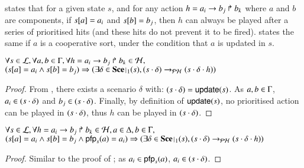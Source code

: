  states that for a given state $s$, and for any action $h = a_i\rightarrow b_j\Rsh b_k$ where $a$ and $b$ are components,
if ${s[a]} = a_i$ and ${s[b]} = b_j$, then
$h$ can always be played after a series of prioritised hits (and these hits do not prevent it to be fired).
 states the same if $a$ is a cooperative sort, under the condition that $a$ is updated in $s$.
\begin{lemma}
\label{lem:hcompcomp}
  $\forall s \in \mathcal{L}, \forall a,b \in \Gamma, \forall h = a_i\rightarrow b_j\Rsh b_k \in \mathcal{H},$\\
  $(\PHget{s}{a} = a_i \wedge \PHget{s}{b} = b_j) \Rightarrow (\exists \delta \in \restriction{\Sce}{1}(s),
  (s \PHplay \delta) \PHPtrans (s \PHplay \delta \PHplay h))$
\end{lemma}
%
\begin{proof}
  From , there exists a scenario $\delta$ with: $(s \cdot \delta) = \mathsf{update}(s)$.
  As $a,b \in \Gamma$, $a_i \in (s \cdot \delta)$ and $b_j \in (s \cdot \delta)$.
  Finally, by definition of $\mathsf{update}(s)$, no prioritised action can be played in $(s \cdot \delta)$, thus $h$ can be played in $(s \cdot \delta)$.
\end{proof}
%
\begin{lemma}
\label{lem:hcscomp}
  $\forall s \in \mathcal{L}, \forall h = a_i\rightarrow b_j\Rsh b_k \in \mathcal{H}, a \in \Delta, b \in \Gamma,$\\
  $(\PHget{s}{a} = a_i \wedge \PHget{s}{b} = b_j \wedge \pfp_s(a) = a_i) \Rightarrow (\exists \delta \in \restriction{\Sce}{1}(s),
  (s \PHplay \delta) \PHPtrans (s \PHplay \delta \PHplay h))$
\end{lemma}
\begin{proof}
  Similar to the proof of ;
  as $a_i \in \mathsf{pfp}_s(a)$, $a_i \in (s \cdot \delta)$.
\end{proof}
